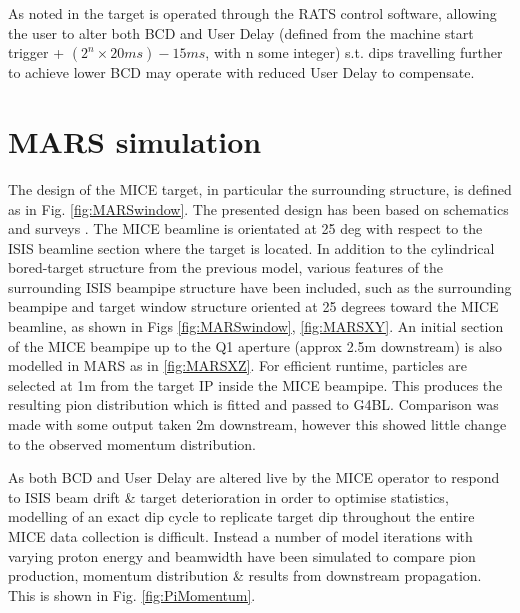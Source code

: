 \documentclass[a4paper,11pt]{article}
\begin{document}
As noted in \cite{micenote480} the target is operated through the RATS control software, allowing the user to alter both BCD and User Delay (defined from the machine start trigger + $(2^{n}\times20ms)-15ms$, with n some integer) s.t. dips travelling further to achieve lower BCD may operate with reduced User Delay to compensate. 

\section{MARS simulation}

The design of the MICE target, in particular the surrounding structure, is defined as in Fig. \ref{fig:MARSwindow}. The presented design has been based on schematics \cite{beampipesurvey1}\cite{beampipesurvey2}\cite{beampipesurvey3} and surveys \cite{ISISbeamlinesurvey}\cite{MICEsurvey}. The MICE beamline is orientated at 25 deg with respect to the ISIS beamline section where the target is located. In addition to the cylindrical bored-target structure from the previous model, various features of the surrounding ISIS beampipe structure have been included, such as the surrounding beampipe and target window structure oriented at 25 degrees toward the MICE beamline, as shown in Figs \ref{fig:MARSwindow}, \ref{fig:MARSXY}. An initial section of the MICE beampipe up to the Q1 aperture (approx 2.5m downstream) is also modelled in MARS as in \ref{fig:MARSXZ}. For efficient runtime, particles are selected at 1m from the target IP inside the MICE beampipe. This produces the resulting pion distribution which is fitted and passed to G4BL. Comparison was made with some output taken 2m downstream, however this showed little change to the observed momentum distribution.

As both BCD and User Delay are altered live by the MICE operator to respond to ISIS beam drift \& target deterioration in order to optimise statistics, modelling of an exact dip cycle to replicate target dip throughout the entire MICE data collection is difficult. Instead a number of model iterations with varying proton energy and beamwidth have been simulated to compare pion production, momentum distribution \& results from downstream propagation. This is shown in Fig. \ref{fig:PiMomentum}. 
\end{document}
